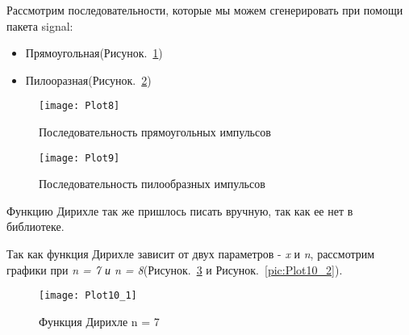 Рассмотрим последовательности, которые мы можем сгенерировать при помощи пакета signal:
\begin{itemize}
\item Прямоугольная(Рисунок.~\ref{pic:Plot8})
\item Пилооразная(Рисунок.~\ref{pic:Plot9})
\end{itemize}


\parindent=1cm %
\begin{figure}[H]
	\begin{center}
		\texttt{[image: Plot8]}
		\caption{Последовательность прямоугольных импульсов} 
		\label{pic:Plot8} %
	\end{center}
\end{figure}


\parindent=1cm %

\begin{figure}[H]
	\begin{center}
		\texttt{[image: Plot9]}
		\caption{Последовательность пилообразных импульсов} 
		\label{pic:Plot9} %
	\end{center}
\end{figure}

Функцию Дирихле так же пришлось писать вручную, так как ее нет в библиотеке.


\parindent=1cm %

Так как функция Дирихле зависит от двух параметров - \textit{x} и \textit{n}, рассмотрим графики при \textit{n = 7  и n = 8}(Рисунок.~\ref{pic:Plot10_1} и Рисунок.~\ref{pic:Plot10_2}).

\begin{figure}[H]
	\begin{center}
		\texttt{[image: Plot10\_1]}
		\caption{Функция Дирихле n = 7} 
		\label{pic:Plot10_1} %
	\end{center}
\end{figure}

